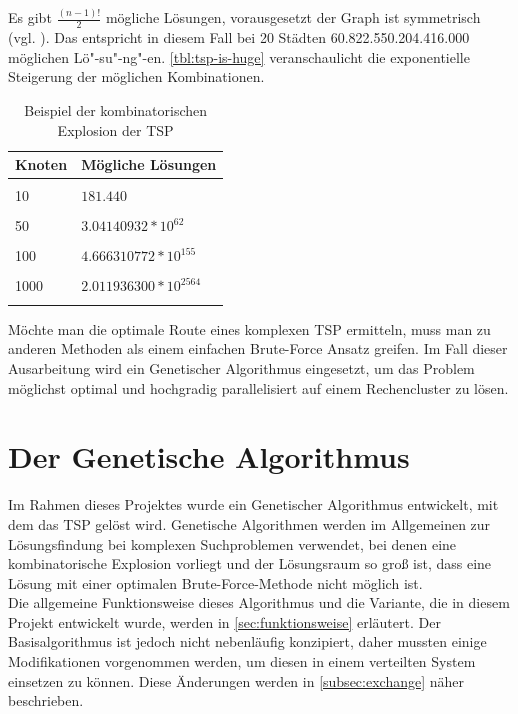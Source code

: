 \documentclass[12pt,a4paper]{scrreprt}
\newcommand{\absatz}{\\[12pt]}
\begin{document}
Es gibt $\frac{(n-1)!}{2}$ mögliche Lösungen, vorausgesetzt der Graph ist symmetrisch (vgl. \cite{groetschel05}). Das entspricht in diesem Fall bei 20 Städten 60.822.550.204.416.000 möglichen Lö"-su"-ng"-en. \autoref{tbl:tsp-is-huge} veranschaulicht die exponentielle Steigerung der möglichen Kombinationen.
\pagebreak

\begin{center}
\begin{longtable}{p{2.5cm} | p{6.5cm} }
Knoten & Mögliche Lösungen  \\
\hline
 & \\
10 & $181.440 $ \\
 & \\
50 & $ 3.04140932*10^{62} $ \\
 & \\
100 & $ 4.666310772*10^{155} $ \\
 & \\
1000 & $ 2.011936300*10^{2564} $ \\

\caption{Beispiel der kombinatorischen Explosion der TSP}
\label{tbl:tsp-is-huge}
\end{longtable}
\end{center}

Möchte man die optimale Route eines komplexen TSP ermitteln, muss man zu anderen Methoden als einem einfachen Brute-Force Ansatz greifen. Im Fall dieser Ausarbeitung wird ein Genetischer Algorithmus eingesetzt, um das Problem möglichst optimal und hochgradig parallelisiert auf einem Rechencluster zu lösen.

\chapter{Der Genetische Algorithmus}
\label{chap:algorithmus}

Im Rahmen dieses Projektes wurde ein Genetischer Algorithmus entwickelt, mit dem das TSP gelöst wird. Genetische Algorithmen werden im Allgemeinen zur Lösungsfindung bei komplexen Suchproblemen verwendet, bei denen eine kombinatorische Explosion vorliegt und der Lösungsraum so groß ist, dass eine Lösung mit einer optimalen Brute-Force-Methode nicht möglich ist.\absatz
Die allgemeine Funktionsweise dieses Algorithmus und die Variante, die in diesem Projekt entwickelt wurde, werden in \autoref{sec:funktionsweise} erläutert. Der Basisalgorithmus ist jedoch nicht nebenläufig konzipiert, daher mussten einige Modifikationen vorgenommen werden, um diesen in einem verteilten System einsetzen zu können. Diese Änderungen werden in \autoref{subsec:exchange} näher beschrieben.
\end{document}
